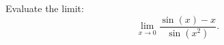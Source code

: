 \documentclass{ximera}
\author{Emma Smith Zbarsky}
\begin{document}
\begin{exercise}

Evaluate the limit: \[\lim_{x\to 0} \frac{\sin(x)-x}{\sin(x^2)}.\]

\begin{multipleChoice}
\choice{$\infty$}
\choice{$-\infty$}
\end{multipleChoice}

\end{exercise}
\end{document}
